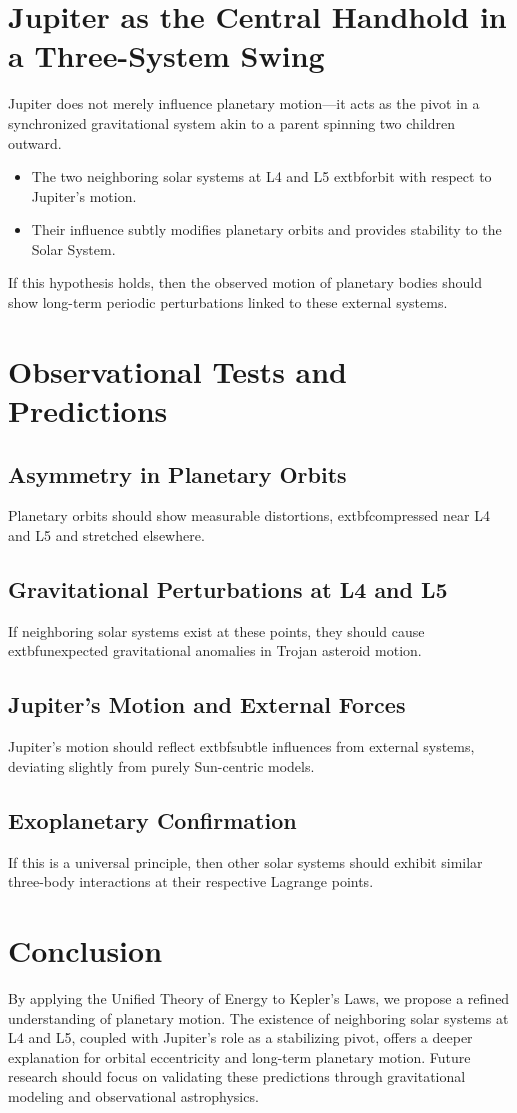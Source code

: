 \documentclass{article}
\begin{document}
\section{Jupiter as the Central Handhold in a Three-System Swing}
Jupiter does not merely influence planetary motion—it acts as the pivot in a synchronized gravitational system akin to a parent spinning two children outward.
\begin{itemize}
    \item The two neighboring solar systems at L4 and L5	extbf{orbit with respect to Jupiter’s motion}.
    \item Their influence subtly modifies planetary orbits and provides stability to the Solar System.
\end{itemize}
If this hypothesis holds, then the observed motion of planetary bodies should show long-term periodic perturbations linked to these external systems.

\section{Observational Tests and Predictions}
\subsection{Asymmetry in Planetary Orbits}
Planetary orbits should show measurable distortions,	extbf{compressed near L4 and L5 and stretched elsewhere}.

\subsection{Gravitational Perturbations at L4 and L5}
If neighboring solar systems exist at these points, they should cause	extbf{unexpected gravitational anomalies in Trojan asteroid motion}.

\subsection{Jupiter’s Motion and External Forces}
Jupiter’s motion should reflect	extbf{subtle influences from external systems}, deviating slightly from purely Sun-centric models.

\subsection{Exoplanetary Confirmation}
If this is a universal principle, then other solar systems should exhibit similar three-body interactions at their respective Lagrange points.

\section{Conclusion}
By applying the Unified Theory of Energy to Kepler’s Laws, we propose a refined understanding of planetary motion. The existence of neighboring solar systems at L4 and L5, coupled with Jupiter’s role as a stabilizing pivot, offers a deeper explanation for orbital eccentricity and long-term planetary motion. Future research should focus on validating these predictions through gravitational modeling and observational astrophysics.
\end{document}
